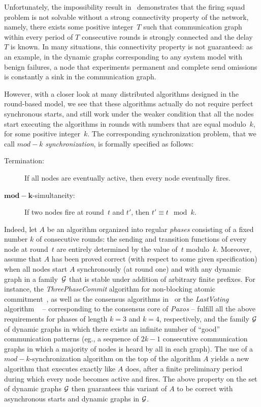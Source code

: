 \documentclass[11pt,letterpaper]{article}
\begin{document}
Unfortunately, the impossibility result in~\cite{CBM18} demonstrates that the firing squad problem
	is not solvable without a strong connectivity property of the network, namely, there exists  some positive
	integer~$T$ such that communication graph within  every period of $T$ consecutive
	rounds is strongly connected and the delay~$T$ is known.
In many situations,  this connectivity property is not guaranteed:
	as an example, in the dynamic graphs corresponding to any system model with benign failures,
	a node  that experiments permanent and complete send omissions
	is  constantly a sink in the  communication graph.

However, with a closer look at many distributed algorithms designed in the round-based model,  we see that
	these algorithms actually  do not require perfect synchronous starts, and still work under the weaker condition that all the nodes
	start executing the algorithms in rounds with numbers that are equal modulo~$k$, for some positive integer~$k$.
The corresponding synchronization problem, that we call $mod-k$  \emph{synchronization}, is formally specified as follows:
	\begin{description}
	\item[Termination:]   If all nodes are eventually active, then  every node eventually fires.
	\item[ $\mathbf{mod-k}$-simultaneity:]  If two nodes fire at round~$t$ and $t'$, then $t' \equiv t \mod k$.
	\end{description}

Indeed, let $A$ be an algorithm  organized into regular  \emph{phases} consisting of  a fixed number  $k$ of consecutive rounds:
	the sending and transition functions of every node at round~$t$ are entirely determined by the value of~$t$ modulo~$k$.
Moreover, assume that $A$ has been proved correct (with respect to some given specification) when all nodes start $A$
	synchronously (at round one) and with any dynamic graph in a family~${\cal G}$ that is stable  under
	addition of arbitrary finite prefixes.
For instance, the \emph{ThreePhaseCommit} algorithm for non-blocking atomic commitment~\cite{BHG87},
	as well as the consensus algorithms in~\cite{DLS88} or the \emph{LastVoting} algorithm ~\cite{CBS09}
	-- corresponding to the consensus core of \emph{Paxos} -- fulfill all the above requirements
	for phases of length $k=3$ and $k=4$, respectively, and the family ${\cal G}$ of dynamic graphs in which
	there exists an infinite number of ``good'' communication patterns
	(eg., a sequence of $2k-1$ consecutive communication graphs  in which a majority of nodes is heard by all
	in   each graph).
The use of a $mod-k$-synchronization algorithm on the top of the algorithm $A$ yields a new algorithm that executes
	exactly like $A$ does, after a finite preliminary period during which every node becomes active and fires.
The above property on the set of dynamic graphs ${\cal G}$ then guarantees this variant of $A$ to be correct with
	asynchronous starts and dynamic graphs in ${\cal G}$.
\end{document}
